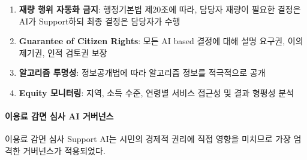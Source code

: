\begin{enumerate}
 \item \textbf{재량 행위 자동화 금지}: 
 행정기본법 제20조에 따라, 담당자 재량이 필요한 결정은 
 AI가 Support하되 최종 결정은 담당자가 수행
 
 \item \textbf{Guarantee of Citizen Rights}: 
 모든 AI based 결정에 대해 설명 요구권, 이의 제기권, 인적 검토권 보장
 
 \item \textbf{알고리즘 투명성}: 
 정보공개법에 따라 알고리즘 정보를 적극적으로 공개
 
 \item \textbf{Equity 모니터링}: 
 지역, 소득 수준, 연령별 서비스 접근성 및 결과 형평성 분석
\end{enumerate}


\paragraph{이용료 감면 심사 AI 거버넌스}

이용료 감면 심사 Support AI는 시민의 경제적 권리에 직접 영향을 미치므로 
가장 엄격한 거버넌스가 적용되었다.

